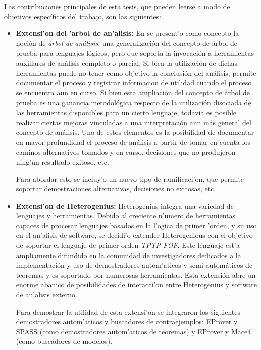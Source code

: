Las contribuciones principales de esta tesis, que pueden leerse a modo de objetivos específicos del trabajo, son las siguientes:

\begin{itemize}
\item \textbf{Extensi'on del 'arbol de an'alisis:} En \cite{heterogenius} se present'o como concepto la noción de \emph{árbol de análisis}: una generalización del concepto de árbol de prueba para lenguajes lógicos, pero que soporta la invocación a herramientas auxiliares de análisis completo o parcial.
Si bien la utilización de dichas herramientas puede no tener como objetivo la conclusión del análisis, permite documentar el proceso y registrar informacion de utilidad cuando el proceso se encuentra aun en curso.
Si bien esta ampliación del concepto de árbol de prueba es una ganancia metodológica respecto de la utilización disociada de las herramientas disponibles para un cierto lenguaje, todavía es posible realizar ciertas mejoras vinculadas a una interpretación aun más general del concepto de análisis. Uno de estos elementos es la posibilidad de documentar en mayor profundidad el proceso de análisis a partir de tomar en cuenta los caminos alternativos tomados y en curso, decisiones que no produjeron ning'un resultado exitoso, etc.

Para abordar esto se incluy'o un nuevo tipo de ramificaci'on, que permite soportar demostraciones alternativas, decisiones no exitosas, etc.

\item \textbf{Extensi'on de Heterogenius:} Heterogenius integra una variedad de lenguajes y herramientas. Debido al creciente n'umero de herramientas capaces de procesar lenguajes basados en la l'ogica de primer 'orden, y su uso en el an'alisis de software, se decidi'o extender Heterogenious con el objetivo de soportar el lenguaje de primer orden \emph{TPTP-FOF}. Este lenguaje est'a ampliamente difundido en la comunidad de investigadores dedicados a la implementación y uso de demostradores autom'aticos y semi-automáticos de teoremas y es soportado por numerosas herramientas. 
Esta extensión abre un enorme abanico de posibilidades de interacci'on entre Heterogenius y software de an'alisis externo. 

Para demostrar la utilidad de esta extensi'on se integraron los siguientes demostradores autom'aticos y buscadores de contraejemplos: EProver y SPASS (como demostradores autom'aticos de teoremas) y EProver y Mace4 (como buscadores de modelos). 


\end{itemize}
